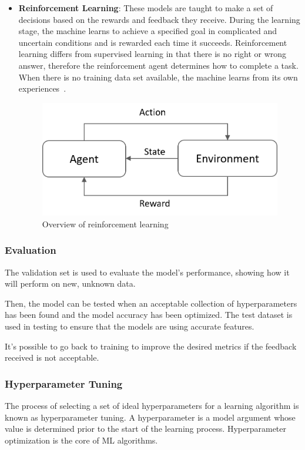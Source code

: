 \begin{itemize}
    \item \textbf{Reinforcement Learning}: These models are taught to make a set of decisions based on the rewards and feedback they receive. During the learning stage, the machine learns to achieve a specified goal in complicated and uncertain conditions and is rewarded each time it succeeds. Reinforcement learning differs from supervised learning in that there is no right or wrong answer, therefore the reinforcement agent determines how to complete a task. When there is no training data set available, the machine learns from its own experiences~\cite{Advani2021WhatUses}.
    
    \begin{figure}[htbp]
        \centering
        \includegraphics[width=0.55\linewidth]{Chapters/Figures/reinforcement.png}
        \caption{Overview of reinforcement learning~\cite{Sah2020MachineTypes}}
        \label{fig:reinforcement}
    \end{figure}
\end{itemize}

\subsubsection{Evaluation}

The validation set is used to evaluate the model's performance, showing how it will perform on new, unknown data.

Then, the model can be tested when an acceptable collection of hyperparameters has been found and the model accuracy has been optimized. The test dataset is used in testing to ensure that the models are using accurate features.

It's possible to go back to training to improve the desired metrics if the feedback received is not acceptable.

\subsubsection{Hyperparameter Tuning}

The process of selecting a set of ideal hyperparameters for a learning algorithm is known as hyperparameter tuning. A hyperparameter is a model argument whose value is determined prior to the start of the learning process. Hyperparameter optimization is the core of \gls{ML} algorithms.

